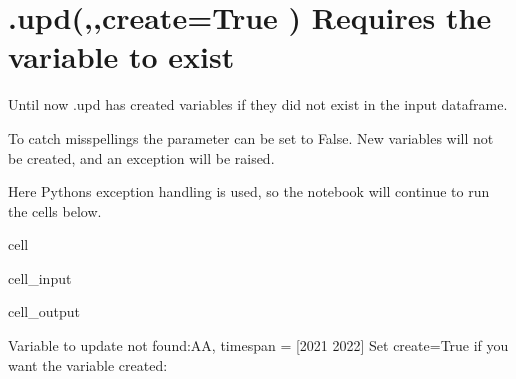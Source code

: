\documentclass[letterpaper,10pt,english]{jupyterBook}
\begin{document}
\section{.upd(,,create=True ) Requires the variable to exist}
\label{\detokenize{content/04_PythonEssentials/UpdateCommand:upd-create-true-requires-the-variable-to-exist}}
\sphinxAtStartPar
Until now .upd has created variables if they did not exist in the input dataframe.

\sphinxAtStartPar
To catch misspellings the parameter  can be set to False.
New variables will not be created, and an exception will be raised.

\sphinxAtStartPar
Here Pythons exception handling is used, so the notebook will continue to run the cells below.

\begin{sphinxuseclass}{cell}\begin{sphinxVerbatimInput}

\begin{sphinxuseclass}{cell_input}
\begin{sphinxVerbatim}[commandchars=\\\{\}]
      
   
      
\end{sphinxVerbatim}

\end{sphinxuseclass}\end{sphinxVerbatimInput}
\begin{sphinxVerbatimOutput}

\begin{sphinxuseclass}{cell_output}
\begin{sphinxVerbatim}[commandchars=\\\{\}]
Variable to update not found:AA, timespan = [2021 2022] 
Set create=True if you want the variable created: 
\end{sphinxVerbatim}

\end{sphinxuseclass}\end{sphinxVerbatimOutput}

\end{sphinxuseclass}
\end{document}
